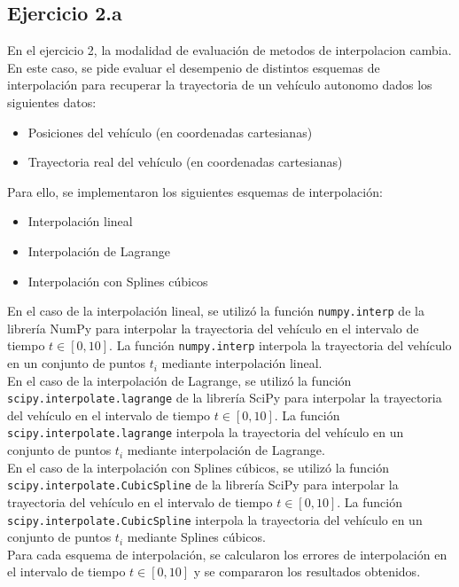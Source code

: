 \subsection{Ejercicio 2.a}
En el ejercicio 2, la modalidad de evaluación de metodos de interpolacion cambia. En este caso, se pide evaluar el desempenio de distintos esquemas de interpolación para recuperar la trayectoria de un vehículo autonomo dados los siguientes datos:
\begin{itemize}
    \item Posiciones del vehículo (en coordenadas cartesianas)
    \item Trayectoria real del vehículo (en coordenadas cartesianas)
\end{itemize}
Para ello, se implementaron los siguientes esquemas de interpolación:
\begin{itemize}
    \item Interpolación lineal
    \item Interpolación de Lagrange
    \item Interpolación con Splines cúbicos
\end{itemize}
En el caso de la interpolación lineal, se utilizó la función \texttt{numpy.interp} de la librería NumPy para interpolar la trayectoria del vehículo en el intervalo de tiempo $t \in [0, 10]$. La función \texttt{numpy.interp} interpola la trayectoria del vehículo en un conjunto de puntos $t_i$ mediante interpolación lineal.\\
En el caso de la interpolación de Lagrange, se utilizó la función \texttt{scipy.interpolate.lagrange} de la librería SciPy para interpolar la trayectoria del vehículo en el intervalo de tiempo $t \in [0, 10]$. La función \texttt{scipy.interpolate.lagrange} interpola la trayectoria del vehículo en un conjunto de puntos $t_i$ mediante interpolación de Lagrange.\\
En el caso de la interpolación con Splines cúbicos, se utilizó la función \texttt{scipy.interpolate.CubicSpline} de la librería SciPy para interpolar la trayectoria del vehículo en el intervalo de tiempo $t \in [0, 10]$. La función \texttt{scipy.interpolate.CubicSpline} interpola la trayectoria del vehículo en un conjunto de puntos $t_i$ mediante Splines cúbicos.\\
Para cada esquema de interpolación, se calcularon los errores de interpolación en el intervalo de tiempo $t \in [0, 10]$ y se compararon los resultados obtenidos.\\

